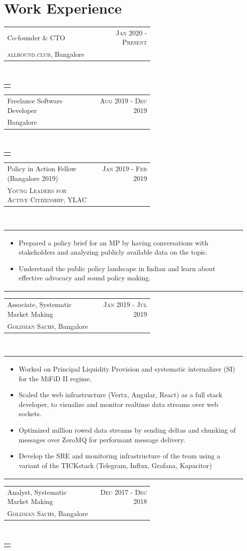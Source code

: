 \documentclass[a4paper]{article} %
\newcommand{\verticalspacing}{-0.25cm}
\newcommand{\bulletspace}{0.7cm}
\newcommand{\projectheadspacing}{6.9cm}
\newcommand{\cproject}[5]{%
    \begin{tabular}{p{0.60\linewidth}r}
        \textcolor{NavyBlue}{\small #2} & \multicolumn{1}{m{ \projectheadspacing{} }}{\raggedleft \small {\textsc{#1}}}\\
        \small {#3} & \small {#4}
    \end{tabular}\\
    \begin{tabular}{p{0.98\linewidth}}
    \vspace{-0.3cm}
        \small{#5}
    \end{tabular}
    \vspace{\verticalspacing{}}
}
\begin{document}
%
\section{Work Experience}

\cproject
      {Jan 2020 - Present}
      {Co-founder \& CTO}
      {\textsc{allround.club}, Bangalore}
      {}
      {%
      }

\cproject
      {Aug 2019 - Dec 2019}
      {Freelance Software Developer}
      {Bangalore}
      {}
      {%
      }

\cproject
      {Jan 2019 - Feb 2019}
      {Policy in Action Fellow (Bangalore 2019)}
      {\textsc{Young Leaders for Active Citizenship}, YLAC}
      {}
      {%
        \begin{itemize}[leftmargin=\bulletspace{}]
            \item Prepared a policy brief for an MP by having conversations with stakeholders and analyzing publicly available data on the topic.
            \item Understand the public policy landscape in Indian and learn about effective advocacy and sound policy making.
        \end{itemize}
      }

\cproject
      {Jan 2019 - Jul 2019}
      {Associate, Systematic Market Making}
      {\textsc{Goldman Sachs}, Bangalore}
      {}
      {%
        \begin{itemize}[leftmargin=\bulletspace{}]
          \item Worked on Principal Liquidity Provision and systematic internalizer (SI) for the MiFiD II regime.
          \item Scaled the web infrastructure (Vertx, Angular, React) as a full stack developer, to visualize
                and monitor realtime data streams over web sockets.
          \item Optimized million rowed data streams by sending deltas and chunking of messages over ZeroMQ for performant
                message delivery.
          \item Develop the SRE and monitoring infrastructure of the team using a variant of the TICKstack (Telegram, Influx, Grafana, Kapacitor)
        \end{itemize}
      }

\cproject
      {Dec 2017 - Dec 2018}
      {Analyst, Systematic Market Making}
      {\textsc{Goldman Sachs}, Bangalore}
      {}
      {}
\end{document}
